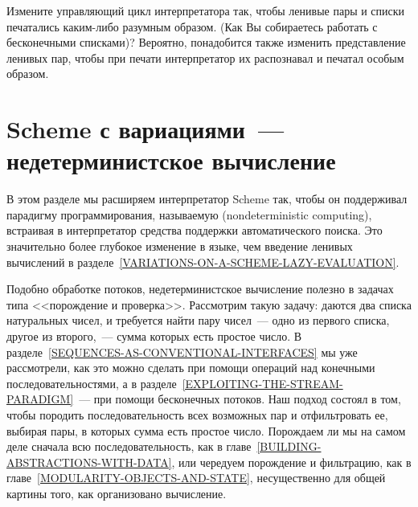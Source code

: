 \begin{exercise}{4.34}%
\label{EX4.34}%
Измените управляющий цикл интерпретатора так, чтобы ленивые
пары и списки печатались каким-либо разумным образом.  (Как Вы собираетесь 
работать
с бесконечными списками)?  Вероятно, понадобится также изменить
представление ленивых пар, чтобы при печати интерпретатор их
распознавал и печатал особым образом.
\end{exercise}

\section{Scheme с вариациями~---\protect\\ недетерминистское
вычисление}
\label{VARIATIONS-ON-A-SCHEME-NONDETERMINISTIC-COMPUTING}%


В этом разделе мы расширяем интерпретатор Scheme так, чтобы
он поддерживал  парадигму программирования, называемую 
 (nondeterministic 
computing), встраивая в интерпретатор средства
поддержки  автоматического поиска.
Это значительно более глубокое 
изменение в языке, чем введение ленивых вычислений в 
разделе~\ref{VARIATIONS-ON-A-SCHEME-LAZY-EVALUATION}.

Подобно обработке потоков, недетерминистское вычисление
полезно в задачах типа <<порождение и проверка>>.  Рассмотрим такую задачу:
даются два списка натуральных чисел, и требуется найти пару
чисел~--- одно из первого списка, другое из второго,~--- сумма которых
есть простое число.  В 
разделе~\ref{SEQUENCES-AS-CONVENTIONAL-INTERFACES} мы уже
рассмотрели, как это можно сделать при помощи
операций над конечными последовательностями, а в 
разделе~\ref{EXPLOITING-THE-STREAM-PARADIGM}~--- при
помощи бесконечных потоков. Наш подход состоял в том, чтобы породить
последовательность всех возможных пар и отфильтровать ее, выбирая
пары, в которых сумма есть простое число.  Порождаем ли мы на самом деле
сначала всю последовательность, как в 
главе~\ref{BUILDING-ABSTRACTIONS-WITH-DATA}, или чередуем
порождение и фильтрацию, как в 
главе~\ref{MODULARITY-OBJECTS-AND-STATE}, несущественно для
общей картины того, как организовано вычисление.

